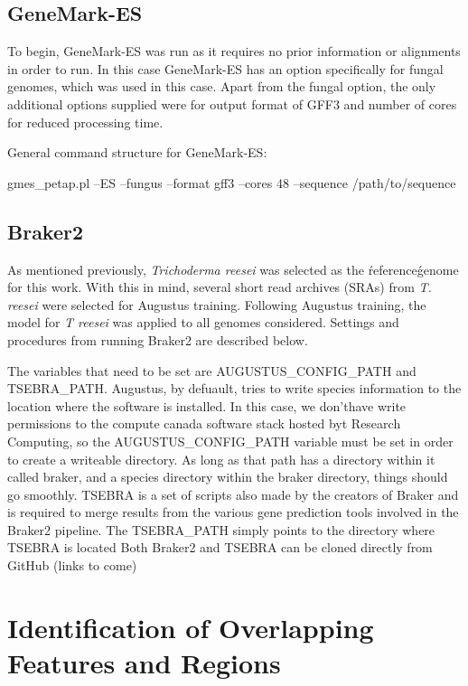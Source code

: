 \subsection{GeneMark-ES}

To begin, GeneMark-ES was run as it requires no prior information or
alignments in order to run. In this case GeneMark-ES has an option
specifically for fungal genomes, which was used in this case. Apart
from the fungal option, the only additional options supplied were for
output format of GFF3 and number of cores for reduced processing time.

General command structure for GeneMark-ES:

gmes\_petap.pl --ES --fungus
--format gff3 --cores 48 --sequence /path/to/sequence

\subsection{Braker2}

As mentioned previously, \textit{Trichoderma reesei} was selected as
the \'reference\' genome for this work. With this in mind, several
short read archives (SRAs) from \textit{T. reesei} were selected for
Augustus training. Following Augustus training, the model for
\textit{T reesei} was applied to all genomes considered. Settings and
procedures from running Braker2 are described below.

The variables that need to be set are AUGUSTUS\_CONFIG\_PATH and
TSEBRA\_PATH. Augustus, by defuault, tries to write species
information to the location where the software is installed. In this
case, we don'thave write permissions to the compute canada software
stack hosted byt Research Computing, so the AUGUSTUS\_CONFIG\_PATH
variable must be set in order to create a writeable directory. As long
as that path has a directory within it called braker, and a species
directory within the braker directory, things should go
smoothly. TSEBRA is a set of scripts also made by the creators of
Braker and is required to merge results from the various gene
prediction tools involved in the Braker2 pipeline. The TSEBRA\_PATH
simply points to the directory where TSEBRA is located Both Braker2
and TSEBRA can be cloned directly from GitHub (links to come)

\section{Identification of Overlapping Features and Regions}

